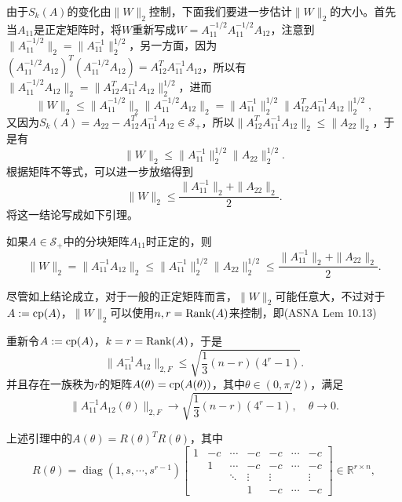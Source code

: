 \documentclass[a4paper,10pt]{ctexart}
\begin{document}
由于$ S_k(A) $的变化由$ \| W \|_2 $控制，下面我们要进一步估计$ \| W \|_2 $的大小。首先当$ A_{11} $是正定矩阵时，将$ W $重新写成$ W = A_{11}^{-1/2} A_{11}^{-1/2} A_{12} $，注意到$ \| A_{11}^{-1 / 2} \|_2 = \| A_{11}^{-1} \|_2^{1 / 2} $，另一方面，因为$ (A_{11}^{-1/2} A_{12})^T(A_{11}^{-1/2} A_{12}) = A_{12}^T A_{11}^{-1}A_{12} $，所以有$ \| A_{11}^{-1/2} A_{12} \|_2 = \| A_{12}^T A_{11}^{-1}A_{12} \|_2^{1 / 2} $，进而
\[
    \| W \|_2 \leqslant \| A_{11}^{-1/2} \|_2  \| A_{11}^{-1/2} A_{12} \|_2 = \| A_{11}^{-1} \|_2^{1 / 2} \| A_{12}^T A_{11}^{-1}A_{12} \|_2^{1 / 2},
\]
又因为$ S_k(A) = A_{22} - A_{12}^T A_{11}^{-1}A_{12}\in \mathcal{S}_+ $，所以$ \| A_{12}^T A_{11}^{-1}A_{12} \|_2 \leqslant \| A_{22} \|_2 $，于是有
\[
    \| W \|_2 \leqslant \| A_{11}^{-1} \|_2^{1 / 2} \| A_{22} \|_2^{1 / 2}.
\]
根据矩阵不等式，可以进一步放缩得到
\[
    \| W \|_2 \leqslant \frac{\| A_{11}^{-1} \|_2 + \| A_{22} \|_2}{2} .
\]
将这一结论写成如下引理。
\begin{lemma}
    如果$ A\in \mathcal{S}_+ $中的分块矩阵$ A_{11} $时正定的，则
    \[
        \| W \|_2 = \| A_{11}^{-1}A_{12} \|_2  \leqslant \| A_{11}^{-1} \|_2^{1 / 2} \| A_{22} \|_2^{1 / 2} \leqslant \frac{\| A_{11}^{-1} \|_2 + \| A_{22} \|_2}{2}.
    \]
\end{lemma}
尽管如上结论成立，对于一般的正定矩阵而言，$ \| W \|_2 $可能任意大，不过对于$ A:={\rm cp}(A) $，$ \| W \|_2 $可以使用$ n,r={\rm Rank}(A) $来控制，即(ASNA Lem 10.13)
\begin{lemma}\label{lem:CholeskyDecW}
    重新令$ A:={\rm cp}(A) $，$ k = r= {\rm Rank}(A) $，于是
    \begin{equation}
        \| A_{11}^{-1}A_{12} \|_{2,F}\leqslant \sqrt{\frac{1}{3}(n-r)(4^r-1)}. 
    \end{equation}
    并且存在一族秩为$ r $的矩阵$ A(\theta) = {\rm cp}(A(\theta)) $，其中$ \theta\in (0, \pi / 2) $，满足
    \begin{equation}
        \| A_{11}^{-1}A_{12}(\theta) \|_{2,F} \longrightarrow \sqrt{\frac{1}{3}(n-r)(4^r-1)}, \quad \theta\to 0.
    \end{equation}
\end{lemma}
\noindent 上述引理中的$ A(\theta) = R(\theta)^T R(\theta) $，其中
\[
    R(\theta) = \operatorname{diag}(1, s, \cdots , s^{r-1})
    \begin{bmatrix}
         1 & -c & \cdots & -c & -c & \cdots & -c \\
         & 1 & \cdots & -c & -c & \cdots & -c\\
         &  & \ddots & \vdots & \vdots & & \vdots \\
         &  &  & 1 & -c & \cdots & -c
    \end{bmatrix}\in \mathbb{R}^{r \times n},
\]
\end{document}

